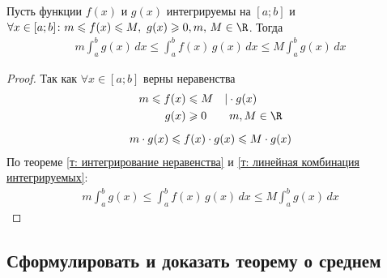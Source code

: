 \begin{theorem}
    Пусть функции $f(x)$ и $g(x)$ интегрируемы на $[a;b]$ и $\forall x \in [a;b]\colon m \leqslant f(x) \leqslant M,\ {g(x) \geqslant 0},\break m,\, M \in \R$. Тогда
    \begin{gather*}
        \boxed{m \int_{a}^{b} g(x)\, dx \leqslant \int_{a}^{b} f(x)\, g(x)\, dx \leqslant M \int_{a}^{b} g(x)\, dx}
    \end{gather*}
\end{theorem}
\begin{proof}
    Так как $\forall x \in [a;b]$ верны неравенства
    \begin{gather*}
        \begin{aligned}
            m \leqslant f(x) &\leqslant M\quad | \cdot g(x) \\
            g(x) &\geqslant 0\qquad m, M \in \R
        \end{aligned} \\[1ex]
        m\cdot g(x) \leqslant f(x)\cdot g(x) \leqslant M \cdot g(x)
    \end{gather*}
    По теореме \ref{т: интегрирование неравенства} и \ref{т: линейная комбинация интегрируемых}:
    \begin{gather*}
        m \int_{a}^{b} g(x) \leqslant \int_{a}^{b} f(x)\, g(x)\, dx \leqslant M \int_{a}^{b} g(x)\, dx
    \end{gather*}
\end{proof}

\subsection{Сформулировать и доказать теорему о среднем}

